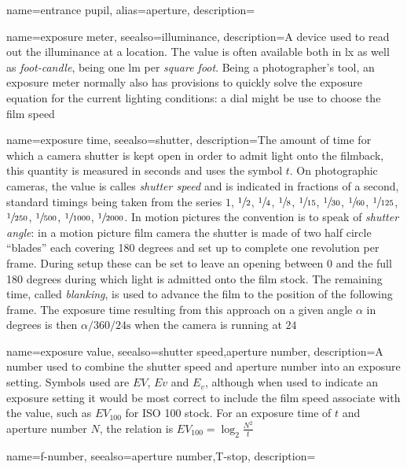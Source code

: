 {
	name={entrance pupil},
	alias={aperture},
	description=\nopostdesc
}

{
	name={exposure meter},
	seealso={illuminance},
	description={A device used to read out the illuminance at a location. The value is often
		available both in \unit{\lux} as well as \textsl{foot-candle}, being one \unit{\lumen}
		per \textsl{square foot}. Being a photographer's tool, an exposure meter normally also
		has provisions to quickly solve the exposure equation for the current lighting
		conditions: a dial might be use to choose the film speed }
}

{
	name={exposure time},
	seealso={shutter},
	description={The amount of time for which a camera shutter is kept open in order to
		admit light onto the filmback, this quantity is measured in seconds and uses the
		symbol $t$. 
		On photographic cameras, the value is calles \textsl{shutter speed} and is 
		indicated in fractions of a second, standard timings being
		taken from the series $1$, $\sfrac12$, $\sfrac14$, $\sfrac18$, 
		$\sfrac1{15}$, $\sfrac1{30}$, $\sfrac1{60}$, $\sfrac1{125}$, 
		$\sfrac1{250}$, $\sfrac1{500}$, $\sfrac1{1000}$, $\sfrac1{2000}$.
		In motion pictures the convention is to speak of \textsl{shutter angle}:
		in a motion picture film camera the shutter is made of two half circle ``blades'' 
		each covering 180 degrees and set up to complete one revolution per frame. 
		During setup these can be set to leave an opening between 0 and the
		full 180 degrees during which light is admitted onto the film stock.
		The remaining time, called \textsl{blanking}, is used to advance the film
		to the position of the following frame. The exposure time resulting from this 
		approach on a given angle $\alpha$ in degrees is then $\alpha/360/24 \unit{\second}$
		when the camera is running at $24$ }
}

{
	name={exposure value},
	seealso={shutter speed,aperture number},
	description={A number used to combine the shutter speed and aperture number into an
		exposure setting. 
		Symbols used are $EV$, $Ev$ and $E_v$, although when used to indicate an exposure 
		setting it would be most correct to include the film speed associate with the value, 
		such as $EV_{100}$ for ISO 100 stock.
		For an exposure time of $t$ and aperture number $N$, the relation is
		$EV_{100} = \log_2\frac{N^2}{t}$}
}

{
	name={f-number},
	seealso={aperture number,T-stop},
	description=\nopostdesc
}

